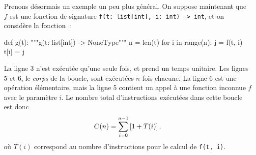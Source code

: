 \documentclass{magnolia}
\begin{document}
\vspace{2ex}
Prenons désormais un exemple un peu plus général. 
On suppose maintenant que $f$ est une fonction
de signature \verb!f(t: list[int], i: int) -> int!, et on considère la fonction~:

\begin{pythoncodeline}  
def g(t):
    """g(t: list[int]) -> NoneType"""
    n = len(t)
    for i in range(n):
        j = f(t, i)
        t[i] = j
\end{pythoncodeline}

\noindent
La ligne 3 n'est exécutée qu'une seule fois, et prend un temps unitaire.
Les lignes 5 et 6, le \emph{corps} de la boucle, sont exécutées $n$ fois
chacune. La ligne 6 est une opération élémentaire, mais la ligne 5 contient
un appel à une fonction inconnue $f$ avec le paramètre $i$. Le nombre
total d'instructions exécutées dans cette boucle est donc
\[C(n)=\sum_{i = 0}^{n - 1} \left[1 + T(i)\right].\] où $T(i)$ correspond au
nombre d'instructions pour le calcul de \verb!f(t, i)!.
\end{document}
